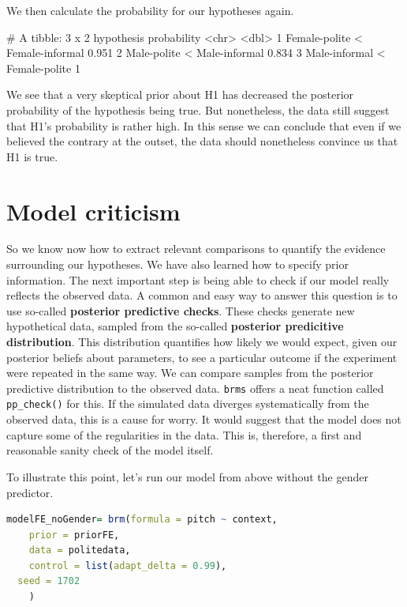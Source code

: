 \documentclass[nobib]{tufte-handout}
\begin{document}
We then calculate the probability for our hypotheses again.

\medskip

\begin{minipage}[]{\textwidth}
\begin{rc}
# A tibble: 3 x 2
  hypothesis                      probability
  <chr>                                 <dbl>
1 Female-polite < Female-informal       0.951
2 Male-polite < Male-informal           0.834
3 Male-informal < Female-polite         1   
\end{rc}
\end{minipage}

\noindent We see that a very skeptical prior about H1 has decreased the posterior probability
of the hypothesis being true. But nonetheless, the data still suggest that H1's probability is
rather high. In this sense we can conclude that even if we believed the contrary at the outset,
the data should nonetheless convince us that H1 is true.

\section{Model criticism}

So we know now how to extract relevant comparisons to quantify the evidence surrounding our hypotheses. We have also learned how to specify prior information. The next important step is being able to check if our model really reflects the observed data. A common and easy way to answer this question is to use so-called \textbf{posterior predictive checks}. These checks generate new hypothetical data, sampled from the so-called \textbf{posterior predicitive distribution}. This distribution quantifies how likely we would expect, given our posterior beliefs about parameters, to see a particular outcome if the experiment were repeated in the same way. We can compare samples from the posterior predictive distribution to the observed data. \texttt{brms} offers a neat function called \texttt{pp\_check()} for this. If the simulated data diverges systematically from the observed data, this is a cause for worry. It would suggest that the model does not capture some of the regularities in the data. This is, therefore, a first and reasonable sanity check of the model itself.

To illustrate this point, let's run our model from above without the gender predictor. 

\bigskip

\begin{minipage}[]{1\textwidth}
\begin{lstlisting}[language=R]
modelFE_noGender= brm(formula = pitch ~ context,
	prior = priorFE,
	data = politedata,
	control = list(adapt_delta = 0.99),
  seed = 1702
	)
\end{lstlisting}
\end{minipage}
\end{document}
